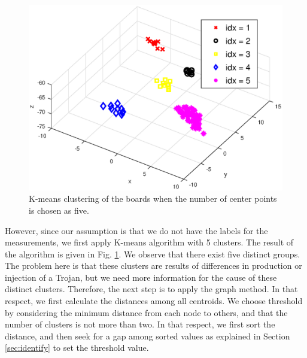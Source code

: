 \documentclass[journal]{IEEEtran}
\begin{document}
\begin{figure}[ht]
	\centering
	\includegraphics[trim=0.0in 0.0in 0.0in 0.0in,clip=true,width=\linewidth]{figure/kmeansResult.eps}
	\caption{K-means clustering of the boards when the number of center points is chosen as five.}
	\label{fig:kmeans}
\end{figure}

However, since our assumption is that we do not have the labels for the measurements, we first apply K-means algorithm with 5 clusters. The result of the algorithm is given in Fig. \ref{fig:kmeans}. We observe that there exist five distinct groups. The problem here is that these clusters are results of differences in production or injection of a Trojan, but we need more information for the cause of these distinct clusters. Therefore, the next step is to apply the graph method. In that respect, we first calculate the distances among all centroids. We choose threshold by considering the minimum distance from each node to  others, and that the number of clusters is not more than two.  In that respect, we first sort the distance, and then seek for a gap among sorted values as explained in Section \ref{sec:identify} to set the threshold value.
\end{document}
